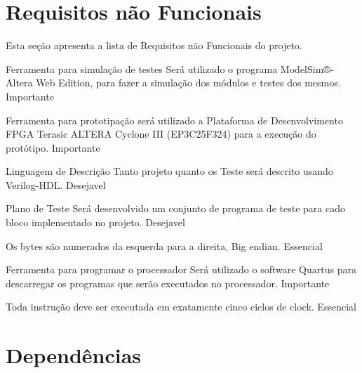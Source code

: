 \documentclass{article}
\begin{document}
\section{Requisitos não Funcionais}
Esta seção apresenta a lista de Requisitos não Funcionais do projeto.

  \begin{nonfunctional}

    \requirement
    {Ferramenta para simulação de testes}
    {Será utilizado o programa ModelSim®-Altera Web Edition, para fazer a simulação dos módulos e testes dos mesmos.}
    {Importante}

    \requirement
    {Ferramenta para prototipação}
    {será utilizado a Plataforma de Desenvolvimento FPGA  Terasic ALTERA Cyclone III (EP3C25F324) para a execução do protótipo.}
    {Importante}

    \requirement
    {Linguagem de Descrição}
    {Tanto projeto quanto os Teste será descrito usando Verilog-HDL.}
    {Desejavel}

    \requirement
    {Plano de Teste}
    {Será desenvolvido um conjunto de programa de teste para cado bloco implementado no projeto. }
    {Desejavel}

    {Os bytes são numerados da esquerda para a direita, Big endian.}
    {Essencial}

    \requirement
    {Ferramenta para programar o processador}
    {Será utilizado o software Quartus para descarregar os programas que serão executados no processador.}
    {Importante}


      {Toda instrução deve ser executada em exatamente cinco ciclos de clock.}
      {Essencial}

  \end{nonfunctional}

\section{Dependências}

  \begin{dependencies}
\end{dependencies}

% 
% 
\end{document}
